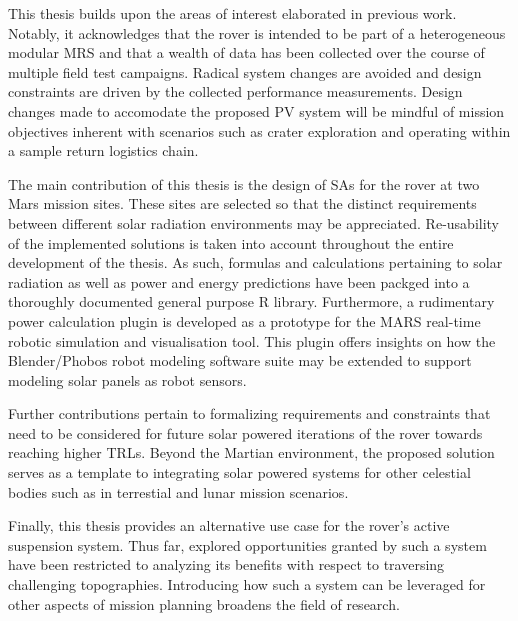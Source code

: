 This thesis builds upon the areas of interest elaborated in previous work. Notably, it acknowledges that the rover is intended to be part of a heterogeneous modular \ac{MRS} and that a wealth of data has been collected over the course of multiple field test campaigns. Radical system changes are avoided and design constraints are driven by the collected performance measurements. Design changes made to accomodate the proposed \ac{PV} system will be mindful of mission objectives inherent with scenarios such as crater exploration and operating within a sample return logistics chain.

The main contribution of this thesis is the design of \acp{SA} for the rover at two Mars mission sites. These sites are selected so that the distinct requirements between different solar radiation environments may be appreciated. Re-usability of the implemented solutions is taken into account throughout the entire development of the thesis. As such, formulas and calculations pertaining to solar radiation as well as power and energy predictions have been packged into a thoroughly documented general purpose R library. Furthermore, a rudimentary power calculation plugin is developed as a prototype for the MARS real-time robotic simulation and visualisation tool. This plugin offers insights on how the Blender/Phobos robot modeling software suite may be extended to support modeling solar panels as robot sensors.

Further contributions pertain to formalizing requirements and constraints that need to be considered for future solar powered iterations of the rover towards reaching higher \acp{TRL}. Beyond the Martian environment, the proposed solution serves as a template to integrating solar powered systems for other celestial bodies such as in terrestial and lunar mission scenarios.

Finally, this thesis provides an alternative use case for the rover's active suspension system. Thus far, explored opportunities granted by such a system have been restricted to analyzing its benefits with respect to traversing challenging topographies. Introducing how such a system can be leveraged for other aspects of mission planning broadens the field of research.
